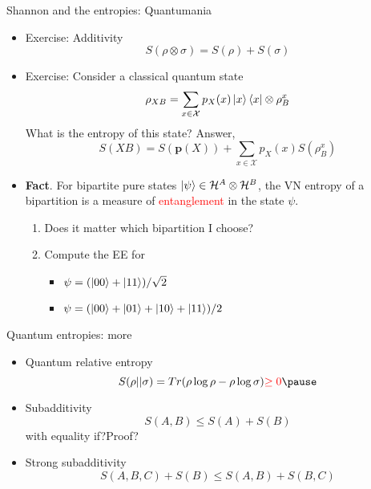 \documentclass[handout]{beamer}
\newcommand{\Hilb}{\mathcal{H}}
\begin{document}
\begin{frame}{Shannon and the entropies: Quantumania}
    \begin{itemize}
        \item Exercise: Additivity
        \begin{equation}
            S(\rho\otimes\sigma) = S(\rho) + S(\sigma)
        \end{equation}\pause 
        \item Exercise: Consider a classical quantum state
        \begin{equation}
            \rho_{XB} = \sum_{x\in\mathcal{X}}p_X(x)\ket{x}\bra{x} \otimes \rho_B^x
        \end{equation}\pause 
        What is the entropy of this state? Answer,
        \begin{equation}
            S(XB) = S(\mathbf{p}(X)) + \sum_{x\in\mathcal{X}}p_X(x)S(\rho_B^x)
        \end{equation}\pause 
        \item \textbf{Fact}. For bipartite pure states $\ket{\psi} \in \Hilb^A\otimes\Hilb^B$, the VN entropy of a bipartition is a measure of \textcolor{red}{entanglement} in the state $\psi$. \pause 
        \begin{enumerate}
            \item Does it matter which bipartition I choose?\pause 
            \item Compute the EE for \pause 
            \begin{itemize}
                \item $\psi = (\ket{00} + \ket{11})/\sqrt{2}$\pause 
                \item $\psi = (\ket{00} + \ket{01} + \ket{10} + \ket{11})/2$
            \end{itemize}
        \end{enumerate}
    \end{itemize}    \end{frame}
    \begin{frame}{Quantum entropies: more}
        \begin{itemize}
        \item Quantum relative entropy \pause 
        \begin{equation}
            S(\rho||\sigma) = Tr(\rho\log\rho - \rho\log\sigma) \textcolor{red}{\geq 0}\pause 
        \end{equation}
            \item Subadditivity 
            \begin{equation}
                S(A,B) \leq S(A) + S(B)
            \end{equation}\pause 
            with equality if?\pause Proof?\pause 
            \item  Strong subadditivity
            \begin{equation}
                S(A, B, C) + S(B) \leq  S(A, B) + S(B, C)
            \end{equation}
            
        \end{itemize}

\end{frame}
\end{document}
